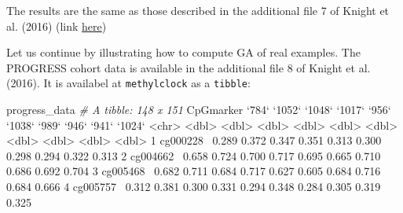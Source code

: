 \documentclass[]{article}
\newcommand{\hlnum}[1]{\textcolor[rgb]{0.816,0.125,0.439}{#1}}%
\newcommand{\hlstr}[1]{\textcolor[rgb]{0.251,0.627,0.251}{#1}}%
\newcommand{\hlcom}[1]{\textcolor[rgb]{0.502,0.502,0.502}{\textit{#1}}}%
\newcommand{\hlopt}[1]{\textcolor[rgb]{0,0,0}{#1}}%
\newcommand{\hlstd}[1]{\textcolor[rgb]{0.251,0.251,0.251}{#1}}%
\newcommand{\hlkwc}[1]{\textcolor[rgb]{0.251,0.251,0.251}{#1}}%
\newenvironment{Shaded}{\begin{myshaded}}{\end{myshaded}}
\newcommand{\DataTypeTok}[1]{\hlkwc{#1}}
\newcommand{\DecValTok}[1]{\hlnum{#1}}
\newcommand{\FloatTok}[1]{\hlnum{#1}}
\newcommand{\StringTok}[1]{\hlstr{#1}}
\newcommand{\CommentTok}[1]{\hlcom{#1}}
\newcommand{\OperatorTok}[1]{\hlopt{#1}}
\newcommand{\ErrorTok}[1]{\textcolor{errorcolor}{#1}}
\newcommand{\NormalTok}[1]{\hlstd{#1}}
\begin{document}
The results are the same as those described in the additional file 7 of Knight et al. (2016) (link \href{https://static-content.springer.com/esm/art\%3A10.1186\%2Fs13059-016-1068-z/MediaObjects/13059_2016_1068_MOESM7_ESM.docx}{here})

Let us continue by illustrating how to compute GA of real examples. The PROGRESS cohort data is available in the additional file 8 of Knight et al. (2016). It is availabel at \texttt{methylclock} as a \texttt{tibble}:

\begin{Shaded}
\begin{Highlighting}[]
\NormalTok{progress_data}
  \CommentTok{# A tibble: 148 x 151}
\NormalTok{     CpGmarker }\StringTok{`}\DataTypeTok{784}\StringTok{`} \StringTok{`}\DataTypeTok{1052}\StringTok{`} \StringTok{`}\DataTypeTok{1048}\StringTok{`} \StringTok{`}\DataTypeTok{1017}\StringTok{`} \StringTok{`}\DataTypeTok{956}\StringTok{`} \StringTok{`}\DataTypeTok{1038}\StringTok{`} \StringTok{`}\DataTypeTok{989}\StringTok{`} \StringTok{`}\DataTypeTok{946}\StringTok{`} \StringTok{`}\DataTypeTok{941}\StringTok{`} \StringTok{`}\DataTypeTok{1024}\StringTok{`}
     \OperatorTok{<}\NormalTok{chr}\OperatorTok{>}\StringTok{     }\ErrorTok{<}\NormalTok{dbl}\OperatorTok{>}\StringTok{  }\ErrorTok{<}\NormalTok{dbl}\OperatorTok{>}\StringTok{  }\ErrorTok{<}\NormalTok{dbl}\OperatorTok{>}\StringTok{  }\ErrorTok{<}\NormalTok{dbl}\OperatorTok{>}\StringTok{ }\ErrorTok{<}\NormalTok{dbl}\OperatorTok{>}\StringTok{  }\ErrorTok{<}\NormalTok{dbl}\OperatorTok{>}\StringTok{ }\ErrorTok{<}\NormalTok{dbl}\OperatorTok{>}\StringTok{ }\ErrorTok{<}\NormalTok{dbl}\OperatorTok{>}\StringTok{ }\ErrorTok{<}\NormalTok{dbl}\OperatorTok{>}\StringTok{  }\ErrorTok{<}\NormalTok{dbl}\OperatorTok{>}
\StringTok{   }\DecValTok{1}\NormalTok{ cg000228}\OperatorTok{~}\StringTok{ }\FloatTok{0.289}  \FloatTok{0.372}  \FloatTok{0.347}  \FloatTok{0.351} \FloatTok{0.313}  \FloatTok{0.300} \FloatTok{0.298} \FloatTok{0.294} \FloatTok{0.322}  \FloatTok{0.313}
   \DecValTok{2}\NormalTok{ cg004662}\OperatorTok{~}\StringTok{ }\FloatTok{0.658}  \FloatTok{0.724}  \FloatTok{0.700}  \FloatTok{0.717} \FloatTok{0.695}  \FloatTok{0.665} \FloatTok{0.710} \FloatTok{0.686} \FloatTok{0.692}  \FloatTok{0.704}
   \DecValTok{3}\NormalTok{ cg005468}\OperatorTok{~}\StringTok{ }\FloatTok{0.682}  \FloatTok{0.711}  \FloatTok{0.684}  \FloatTok{0.717} \FloatTok{0.627}  \FloatTok{0.605} \FloatTok{0.684} \FloatTok{0.716} \FloatTok{0.684}  \FloatTok{0.666}
   \DecValTok{4}\NormalTok{ cg005757}\OperatorTok{~}\StringTok{ }\FloatTok{0.312}  \FloatTok{0.381}  \FloatTok{0.300}  \FloatTok{0.331} \FloatTok{0.294}  \FloatTok{0.348} \FloatTok{0.284} \FloatTok{0.305} \FloatTok{0.319}  \FloatTok{0.325}

\end{Highlighting}
\end{Shaded}
\end{document}
